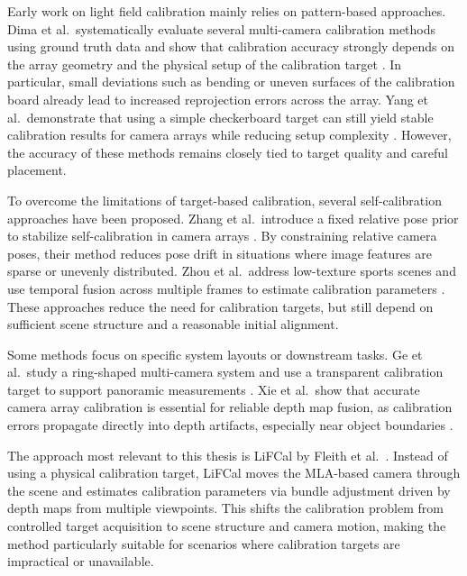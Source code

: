 \documentclass[12pt]{scrartcl}
\begin{document}
Early work on light field calibration mainly relies on pattern-based approaches. Dima et al.\ systematically evaluate several multi-camera calibration methods using ground truth data and show that calibration accuracy strongly depends on the array geometry and the physical setup of the calibration target \cite{7548887}. In particular, small deviations such as bending or uneven surfaces of the calibration board already lead to increased reprojection errors across the array. Yang et al.\ demonstrate that using a simple checkerboard target can still yield stable calibration results for camera arrays while reducing setup complexity \cite{9172948}. However, the accuracy of these methods remains closely tied to target quality and careful placement.
\newline

To overcome the limitations of target-based calibration, several self-calibration approaches have been proposed. Zhang et al.\ introduce a fixed relative pose prior to stabilize self-calibration in camera arrays \cite{10649654}. By constraining relative camera poses, their method reduces pose drift in situations where image features are sparse or unevenly distributed. Zhou et al.\ address low-texture sports scenes and use temporal fusion across multiple frames to estimate calibration parameters \cite{9998530}. These approaches reduce the need for calibration targets, but still depend on sufficient scene structure and a reasonable initial alignment.
\newline

Some methods focus on specific system layouts or downstream tasks. Ge et al.\ study a ring-shaped multi-camera system and use a transparent calibration target to support panoramic measurements \cite{9923591}. Xie et al.\ show that accurate camera array calibration is essential for reliable depth map fusion, as calibration errors propagate directly into depth artifacts, especially near object boundaries \cite{10456113}.
\newline

The approach most relevant to this thesis is LiFCal by Fleith et al.\ \cite{LiFCal}. Instead of using a physical calibration target, LiFCal moves the MLA-based camera through the scene and estimates calibration parameters via bundle adjustment driven by depth maps from multiple viewpoints. This shifts the calibration problem from controlled target acquisition to scene structure and camera motion, making the method particularly suitable for scenarios where calibration targets are impractical or unavailable.
\newline
\end{document}
